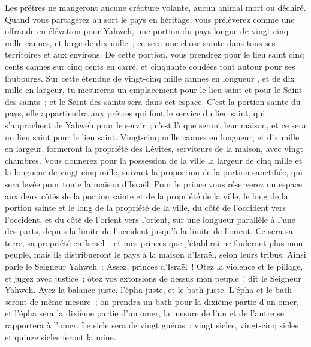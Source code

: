 \begin{multicols}{2}
Les prêtres ne mangeront aucune créature volante, aucun animal mort ou déchiré.
\VerseOne{}Quand vous partagerez au sort le pays en héritage, vous prélèverez comme une offrande en élévation pour Yahweh, une portion du pays longue de vingt-cinq mille cannes, et large de dix mille~; ce sera une chose sainte dans tous ses territoires et aux environs.
De cette portion, vous prendrez pour le lieu saint cinq cents cannes sur cinq cents en carré, et cinquante coudées tout autour pour ses faubourgs.
Sur cette étendue de vingt-cinq mille cannes en longueur , et de dix mille en largeur, tu mesureras un emplacement pour le lieu saint et pour le Saint des saints~; et le Saint des saints sera dans cet espace.
C'est la portion sainte du pays, elle appartiendra aux prêtres qui font le service du lieu saint, qui s'approchent de Yahweh pour le servir~; c'est là que seront leur maison, et ce sera un lieu saint pour le lieu saint.
Vingt-cinq mille cannes en longueur, et dix mille en largeur, formeront la propriété des Lévites, serviteurs de la maison, avec vingt chambres.
Vous donnerez pour la possession de la ville la largeur de cinq mille et la longueur de vingt-cinq mille, suivant la proportion de la portion sanctifiée, qui sera levée pour toute la maison d'Israël.
Pour le prince vous réserverez un espace aux deux côtés de la portion sainte et de la propriété de la ville, le long de la portion sainte et le long de la propriété de la ville, du côté de l'occident vers l'occident, et du côté de l'orient vers l'orient, sur une longueur parallèle à l'une des parts, depuis la limite de l'occident jusqu'à la limite de l'orient.
Ce sera sa terre, sa propriété en Israël~; et mes princes que j'établirai ne fouleront plus mon peuple, mais ils distribueront le pays à la maison d'Israël, selon leurs tribus.
Ainsi parle le Seigneur Yahweh~: Assez, princes d'Israël~! Otez la violence et le pillage, et jugez avec justice~; ôtez vos extorsions de dessus mon peuple~! dit le Seigneur Yahweh.
Ayez la balance juste, l'épha juste, et le bath juste.
L'épha et le bath seront de même mesure~; on prendra un bath pour la dixième partie d'un omer, et l'épha sera la dixième partie d'un omer, la mesure de l'un et de l'autre se rapportera à l'omer.
Le sicle sera de vingt guéras~; vingt sicles, vingt-cinq sicles et quinze sicles feront la mine.

\end{multicols}
